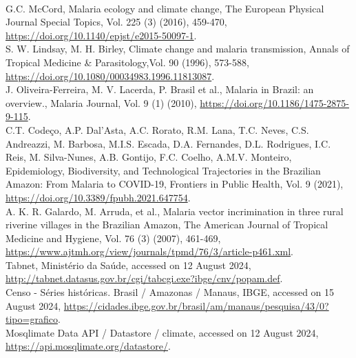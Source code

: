\documentclass[a4paper,fleqn]{cas-dc}
\begin{document}
\begin{thebibliography}{00}
\\
 G.C. McCord, Malaria ecology and climate change, The European Physical Journal Special Topics, Vol. 225 (3) (2016), 459-470, \href{https://doi.org/10.1140/epjst/e2015-50097-1}{https://doi.org/10.1140/epjst/e2015-50097-1}.
\\
 S. W. Lindsay, M. H. Birley, Climate change and malaria transmission, Annals of Tropical Medicine \& Parasitology,Vol. 90 (1996), 573-588, \href{https://doi.org/10.1080/00034983.1996.11813087}{https://doi.org/10.1080/00034983.1996.11813087}.
\\
 J. Oliveira-Ferreira, M. V. Lacerda, P. Brasil et al., Malaria in Brazil: an overview., Malaria Journal, Vol. 9 (1) (2010), \href{https://doi.org/10.1186/1475-2875-9-115}{https://doi.org/10.1186/1475-2875-9-115}.
\\
 C.T. Codeço, A.P. Dal'Asta, A.C. Rorato, R.M. Lana, T.C. Neves, C.S. Andreazzi, M. Barbosa, M.I.S. Escada, D.A. Fernandes, D.L. Rodrigues, I.C. Reis, M. Silva-Nunes, A.B. Gontijo, F.C. Coelho, A.M.V. Monteiro, Epidemiology, Biodiversity, and Technological Trajectories in the Brazilian Amazon: From Malaria to COVID-19, Frontiers in Public Health, Vol. 9 (2021), \href{https://doi.org/10.3389/fpubh.2021.647754}{https://doi.org/10.3389/fpubh.2021.647754}.
\\
 A. K. R. Galardo, M. Arruda, et al., Malaria vector incrimination in three rural riverine villages in the Brazilian Amazon, The American Journal of Tropical Medicine and Hygiene, Vol. 76 (3) (2007), 461-469, \href{https://www.ajtmh.org/view/journals/tpmd/76/3/article-p461.xml}{https://www.ajtmh.org/view/journals/tpmd/76/3/article-p461.xml}.
\\
 Tabnet, Ministério da Saúde, accessed on 12 August 2024, \href{http://tabnet.datasus.gov.br/cgi/tabcgi.exe?ibge/cnv/popam.def}{http://tabnet.datasus.gov.br/cgi/tabcgi.exe?ibge/cnv/popam.def}.
\\
 Censo - Séries históricas. Brasil / Amazonas / Manaus, IBGE, accessed on 15 August 2024, \href{https://cidades.ibge.gov.br/brasil/am/manaus/pesquisa/43/0?tipo=grafico}{https://cidades.ibge.gov.br/brasil/am/manaus/pesquisa/43/0?tipo=grafico}.
\\
 Mosqlimate Data API / Datastore / climate, accessed on 12 August 2024, \href{https://api.mosqlimate.org/datastore/}{https://api.mosqlimate.org/datastore/}.

\end{thebibliography}
\end{document}
